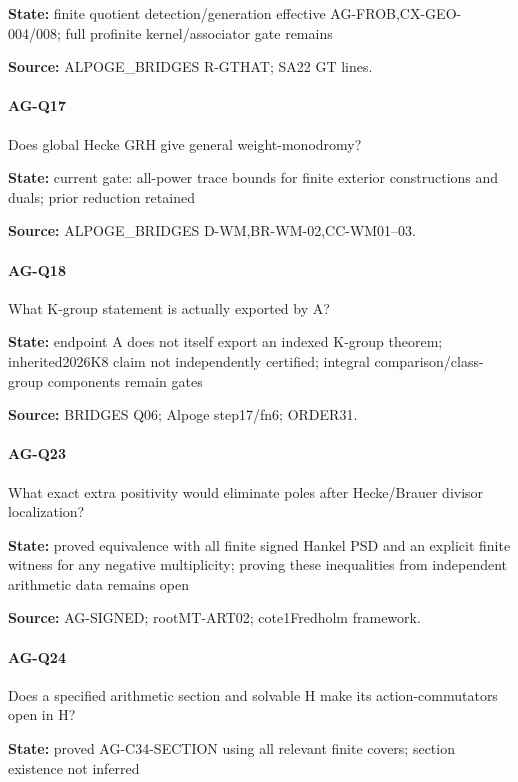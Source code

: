 \documentclass[11pt,a4paper]{article}
\begin{document}
\textbf{State:} finite quotient detection/\allowbreak{}generation effective AG-FROB,CX-GEO-004/\allowbreak{}008; full profinite kernel/\allowbreak{}associator gate remains

\textbf{Source:} ALPOGE\_\allowbreak{}BRIDGES R-GTHAT; SA22 GT lines.

\paragraph{AG-Q17} Does global Hecke GRH give general weight-monodromy?

\textbf{State:} current gate:\allowbreak{} all-power trace bounds for finite exterior constructions and duals; prior reduction retained

\textbf{Source:} ALPOGE\_\allowbreak{}BRIDGES D-WM,BR-WM-02,CC-WM01–\allowbreak{}03.

\paragraph{AG-Q18} What K-group statement is actually exported by A?

\textbf{State:} endpoint A does not itself export an indexed K-group theorem; inherited2026K8 claim not independently certified; integral comparison/\allowbreak{}class-group components remain gates

\textbf{Source:} BRIDGES Q06; Alpoge step17/\allowbreak{}fn6; ORDER31.

\paragraph{AG-Q23} What exact extra positivity would eliminate poles after Hecke/\allowbreak{}Brauer divisor localization?

\textbf{State:} proved equivalence with all finite signed Hankel PSD and an explicit finite witness for any negative multiplicity; proving these inequalities from independent arithmetic data remains open

\textbf{Source:} AG-SIGNED; rootMT-ART02; cote1Fredholm framework.

\paragraph{AG-Q24} Does a specified arithmetic section and solvable H make its action-commutators open in H?

\textbf{State:} proved AG-C34-SECTION using all relevant finite covers; section existence not inferred
\end{document}
